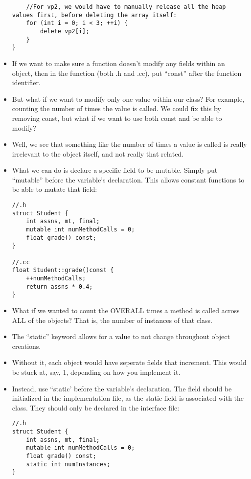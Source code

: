 \documentclass{article}
\begin{document}
\begin{itemize}
\begin{lstlisting}
    //For vp2, we would have to manually release all the heap values first, before deleting the array itself:
    for (int i = 0; i < 3; ++i) {
        delete vp2[i]; 
    }
}
\end{lstlisting}
\item If we want to make sure a function doesn't modify any fields within an object, then in the function (both .h and .cc), put ``const'' after the function identifier.
\item But what if we want to modify only one value within our class?  For example, counting the number of times the value is called.  We could fix this by removing const,  but what if we want to use both const and be able to modify?
\item Well, we see that something like the number of times a value is called is really irrelevant to the object itself, and not really that related.  
\item What we can do is declare a specific field to be mutable.  Simply put ``mutable'' before the variable's declaration.  This allows constant functions to be able to mutate that field:
\begin{lstlisting}
//.h
struct Student {
    int assns, mt, final;
    mutable int numMethodCalls = 0;
    float grade() const;
}

//.cc
float Student::grade()const {
    ++numMethodCalls;
    return assns * 0.4;
}
\end{lstlisting}
\item What if we wanted to count the OVERALL times a method is called across ALL of the objects?  That is, the number of instances of that class.
\item The ``static'' keyword allows for a value to not change throughout object creations.
\item Without it, each object would have seperate fields that increment.  This would be stuck at, say, 1, depending on how you implement it.
\item Instead, use ``static' before the variable's declaration.  The field should be initialized in the implementation file, as the static field is associated with the class.  They should only be declared in the interface file:
\begin{lstlisting}
//.h
struct Student {
    int assns, mt, final;
    mutable int numMethodCalls = 0;
    float grade() const;
    static int numInstances;
}


\end{lstlisting}
\end{itemize}
\end{document}

